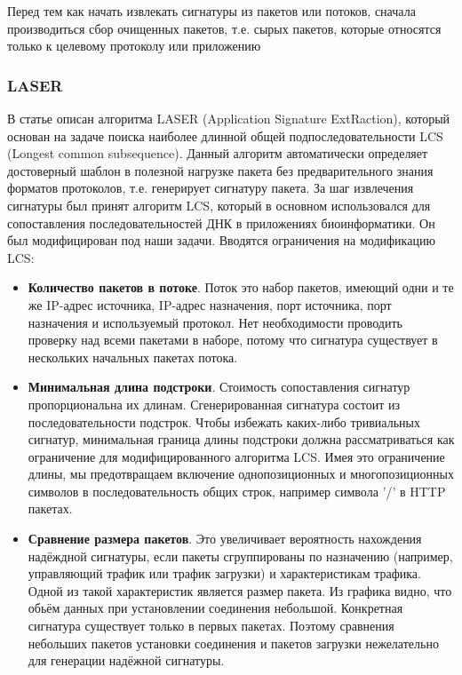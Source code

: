 Перед тем как начать извлекать сигнатуры из пакетов или потоков, сначала производиться сбор очищенных пакетов,
т.е. сырых  пакетов, которые относятся только к целевому протоколу или приложению

\subsubsection{LASER}

В статье \cite{park2008towards} описан алгоритма LASER (Application Signature ExtRaction),
который основан на задаче поиска наиболее длинной общей подпоследовательности LCS (Longest common subsequence).
Данный алгоритм автоматически определяет достоверный шаблон в полезной нагрузке пакета без предварительного знания форматов протоколов, т.е. генерирует сигнатуру пакета.
За шаг извлечения сигнатуры был принят алгоритм LCS, который в основном использовался для сопоставления последовательностей ДНК в приложениях биоинформатики.
Он был модифицирован под наши задачи.
Вводятся ограничения на модификацию LCS:

\begin{itemize}
    \item \textbf{Количество пакетов в потоке}. Поток это набор пакетов, имеющий одни и те же IP-адрес источника,
    IP-адрес назначения, порт источника, порт назначения и используемый протокол.
    Нет необходимости проводить проверку над всеми пакетами в наборе,
    потому что сигнатура существует в нескольких начальных пакетах потока.
    \item \textbf{Минимальная длина подстроки}. Стоимость сопоставления сигнатур пропорциональна их длинам.
    Сгенерированная сигнатура состоит из последовательности подстрок.
    Чтобы избежать каких-либо тривиальных сигнатур,
    минимальная граница длины подстроки должна рассматриваться как ограничение для модифицированного алгоритма LCS.
    Имея это ограничение длины, мы предотвращаем включение однопозиционных и многопозиционных символов в последовательность общих строк,
    например символа '/' в HTTP пакетах.
    \item \textbf{Сравнение размера пакетов}. Это увеличивает вероятность нахождения надёждной сигнатуры,
    если пакеты сгруппированы по назначению (например, управляющий трафик или трафик загрузки) и характеристикам трафика.
    Одной из такой характеристик является размер пакета.
    Из графика видно, что обьём данных при установлении соединения небольшой. Конкретная сигнатура существует только в первых пакетах.
    Поэтому сравнения небольших пакетов установки соединения и пакетов загрузки нежелательно для генерации надёжной сигнатуры.

\end{itemize}

